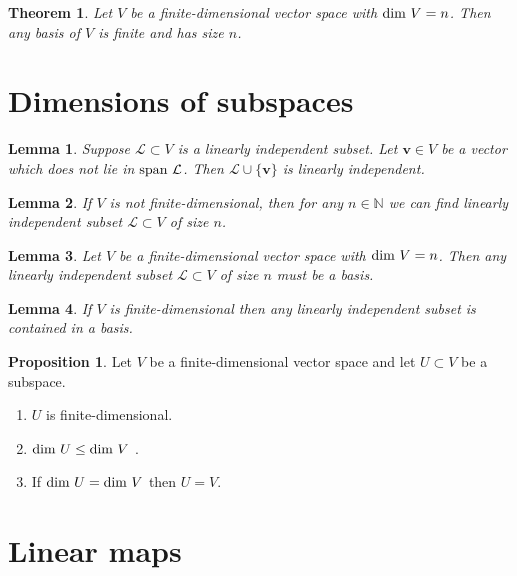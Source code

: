 \documentclass[11pt,a4paper]{article}
\newcommand\N{\mathbb{N}}
\newcommand\Lf{\mathcal{L}}
\newtheorem{lemma}{Lemma}
\newtheorem{theorem}{Theorem}
\theoremstyle{definition}
\newtheorem{proposition}{Proposition}
\begin{document}
\begin{theorem}
    Let $ V $ be a finite-dimensional vector space with $ \textup{dim } V = n $. Then any basis of $ V $ is finite and has size $ n $.
\end{theorem}

\section{Dimensions of subspaces}

\begin{lemma}
    Suppose $ \mathcal{L} \subset V $ is a linearly independent subset. Let $ \mathbf{v} \in V $ be a vector which does not lie in $ \textup{span } \mathcal{L} $.
    Then $ \Lf \cup \{ \mathbf{v} \} $ is linearly independent.
\end{lemma} 

\begin{lemma}
    If $ V $ is not finite-dimensional, then for any $ n \in \N $ we can find linearly independent subset $ \Lf \subset V $ of size $ n $. 
\end{lemma}
 
\begin{lemma}
    Let $ V $ be a finite-dimensional vector space with $ \textup{dim } V = n $. Then any linearly independent subset $ \Lf \subset V $ of size $ n $ must be a basis.
\end{lemma}

\begin{lemma}
    If $ V $ is finite-dimensional then any linearly independent subset is contained in a basis.
\end{lemma}

\begin{proposition}
    Let $ V $ be a finite-dimensional vector space and let $ U \subset V $ be a subspace.
    \begin{enumerate}
        \item $ U $ is finite-dimensional.
        \item $ \textup{dim } U \leq \textup{dim } V$ .
        \item If $ \textup{dim } U = \textup{dim } V$ then $ U = V $.
    \end{enumerate}
\end{proposition}

\section{Linear maps}
\end{document}

